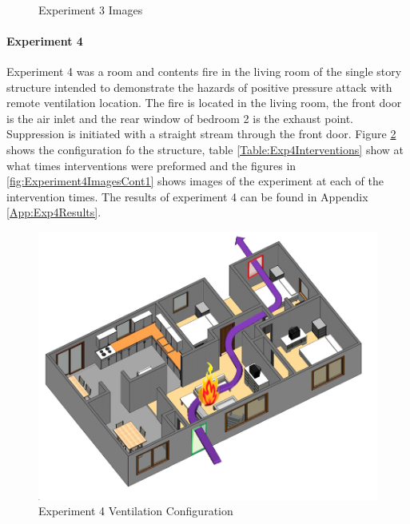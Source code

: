 \documentclass{article}
\begin{document}
\begin{figure}[H]
	\ContinuedFloat 
	\centering 
	 \ 
	\caption{Experiment 3 Images}
	\label{fig:Experiment3ImagesCont3} 
\end{figure}

\paragraph{Experiment 4}\mbox{}

Experiment 4 was a room and contents fire in the living room of the single story structure intended to demonstrate the hazards of positive pressure attack with remote ventilation location. The fire is located in the living room, the front door is the air inlet and the rear window of bedroom 2 is the exhaust point. Suppression is initiated with a straight stream through the front door. Figure \ref{fig:Exp4VentConfig} shows the configuration fo the structure, table \ref{Table:Exp4Interventions} show at what times interventions were preformed and the figures in \ref{fig:Experiment4ImagesCont1} shows images of the experiment at each of the intervention times. The results of experiment 4 can be found in Appendix \ref{App:Exp4Results}.

\begin{figure}[H]
	\centering
	\includegraphics[width=5in]{0_Images/FireExperiments/Single_Story/Experiment_4.jpg}
	\caption{Experiment 4 Ventilation Configuration}
	\label{fig:Exp4VentConfig}
\end{figure}
\end{document}
